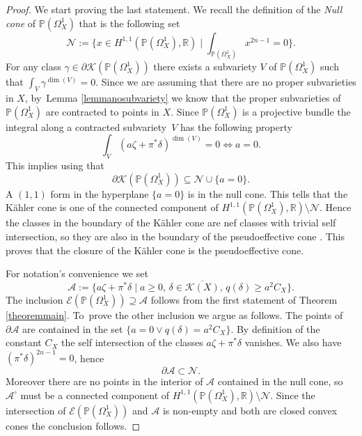 \documentclass[11pt]{article}
\let\mathcal\mathscr
\theoremstyle{plain}
\theoremstyle{definition}
\newcommand{\R}{\ensuremath{\mathbb{R}}}
\newcommand{\PP}{\ensuremath{\mathbb{P}}}
\begin{document}
\begin{proof}
We start proving the last statement.
We recall the definition of the \emph{Null cone} of $\PP(\Omega_X^1)$ that is the following set
\[\textstyle
\mathcal{N}:=\bigl\{x\in H^{1,1} (\PP(\Omega_X^1),\R) \mid \int_{\PP(\Omega_X^1)}x^{2n-1}=0 \bigr\}.
\]
For any class $\gamma \in \partial \mathcal{K}(\PP(\Omega_X^1))$ there exists a subvariety $V$ of $\PP(\Omega_X^1)$ such that $\int_V \gamma^{\dim(V)}=0$. Since we are assuming that there are no proper subvarieties in $X$, by~Lemma \ref{lemmanosubvariety} we know that the proper subvarieties of $\PP(\Omega_X^1)$ are contracted to points in $X$. Since $\PP(\Omega_X^1)$ is a projective bundle the integral along a contracted subvariety~$V$ has the following property
\[\int_V (a \zeta+\pi^*\delta)^{\dim(V)}=0\iff a=0.\]
This implies using \cite[Th.\,0.1]{DP04} that
\[\partial \mathcal{K}(\PP(\Omega_X^1))\subseteq \mathcal{N} \cup \{a=0\}.
\]
A $(1,1)$ form in the hyperplane $\{a=0\}$ is in the null cone. This tells that the Kähler cone is one of the connected component of $H^{1,1}(\PP(\Omega_X^1),\R)\setminus \mathcal{N}$. Hence the classes in the boundary of the Kähler cone are nef classes with trivial self intersection, so they are also in the boundary of the pseudoeffective cone \cite[Th.\,0.5]{DP04}. This proves that the closure of the Kähler cone is the pseudoeffective cone.

For notation's convenience we set
\[
\mathcal{A}:=\bigl\{ a\zeta+\pi^* \delta \mid a\geq 0,\, \delta\in \overline{\mathcal{K}(X)},\, q(\delta)\geq a^2 C_X \bigr\}.
\]
The inclusion $\mathcal{E}(\PP(\Omega_X^1)) \supseteq \mathcal{A}$ follows from the first
statement of Theorem \ref{theoremmain}.
To~prove the other inclusion we argue as follows. The points of $\partial \mathcal{A}$ are contained in the set $\{a=0 \vee q(\delta)= a^2 C_X \}$. By definition of the constant $C_X$ the self intersection of the classes $a \zeta+\pi^*\delta$ vanishes. We also have $(\pi^*\delta )^{2n-1}=0$, hence
\[\partial \mathcal{A} \subset \mathcal{N}.\]
Moreover there are no points in the interior of $\mathcal{A} $ contained in the null cone, so~$\mathcal{A}^{\circ} $ must be a connected component of $H^{1,1}(\PP(\Omega_X^1),\R)\setminus \mathcal{N}$. Since the intersection of $\mathcal{E}(\PP(\Omega_X^1))$ and $ \mathcal{A}$ is non-empty and both are closed convex cones the conclusion follows.
\end{proof}
\end{document}
